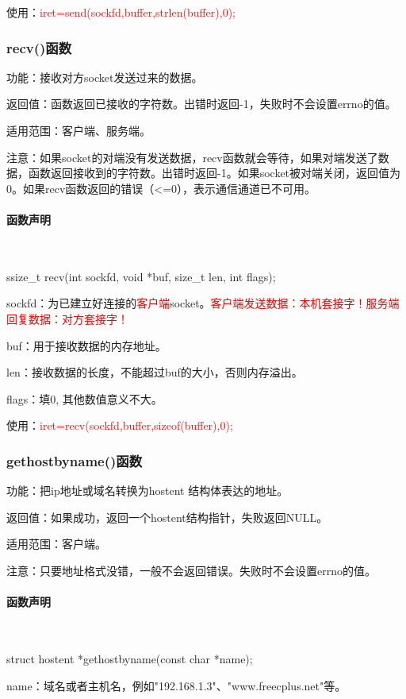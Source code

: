 \documentclass[UTF8]{article}%
\begin{document}
使用：\textcolor{red}{iret=send(sockfd,buffer,strlen(buffer),0);}

\subsubsection{recv()函数}

功能：接收对方socket发送过来的数据。

返回值：函数返回已接收的字符数。出错时返回-1，失败时不会设置errno的值。

适用范围：客户端、服务端。

注意：如果socket的对端没有发送数据，recv函数就会等待，如果对端发送了数据，函数返回接收到的字符数。出错时返回-1。如果socket被对端关闭，返回值为0。如果recv函数返回的错误（<=0），表示通信通道已不可用。

\paragraph{函数声明}~{}

ssize\_t recv(int sockfd, void *buf, size\_t len, int flags);

sockfd：为已建立好连接的\textcolor{red}{客户端}socket。\textcolor{red}{客户端发送数据：本机套接字！服务端回复数据：对方套接字！}

buf：用于接收数据的内存地址。

len：接收数据的长度，不能超过buf的大小，否则内存溢出。

flags：填0, 其他数值意义不大。

使用：\textcolor{red}{iret=recv(sockfd,buffer,sizeof(buffer),0);}

\subsubsection{gethostbyname()函数}

功能：把ip地址或域名转换为hostent 结构体表达的地址。

返回值：如果成功，返回一个hostent结构指针，失败返回NULL。

适用范围：客户端。

注意：只要地址格式没错，一般不会返回错误。失败时不会设置errno的值。

\paragraph{函数声明}~{}

struct hostent *gethostbyname(const char *name);

name：域名或者主机名，例如"192.168.1.3"、"www.freecplus.net"等。
\end{document}
